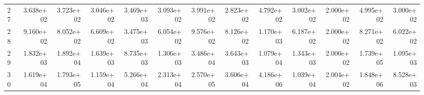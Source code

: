\begin{table}
\begin{tabular}{lrrrrrrrrrrrr}
27 & 3.638e+02 & 3.723e+02 & 3.046e+02 & 3.469e+03 & 3.093e+02 & 3.991e+02 & 2.823e+02 & 4.792e+02 & 3.002e+02 & 2.000e+02 & 4.995e+02 & 3.000e+02 \\
28 & 9.160e+02 & 8.052e+02 & 6.609e+02 & 3.475e+03 & 6.054e+02 & 9.576e+02 & 8.126e+02 & 1.170e+03 & 6.187e+02 & 2.000e+02 & 8.271e+02 & 6.022e+02 \\
29 & 1.832e+03 & 1.892e+04 & 1.639e+03 & 8.735e+03 & 1.306e+03 & 3.486e+04 & 3.643e+03 & 1.079e+04 & 1.343e+03 & 2.000e+02 & 1.739e+05 & 1.095e+03 \\
30 & 1.619e+04 & 1.793e+05 & 1.159e+04 & 5.266e+04 & 2.313e+04 & 2.570e+05 & 3.606e+04 & 4.186e+06 & 1.039e+04 & 2.004e+02 & 1.848e+06 & 8.528e+03 \\
\bottomrule
\end{tabular}
\end{table}

